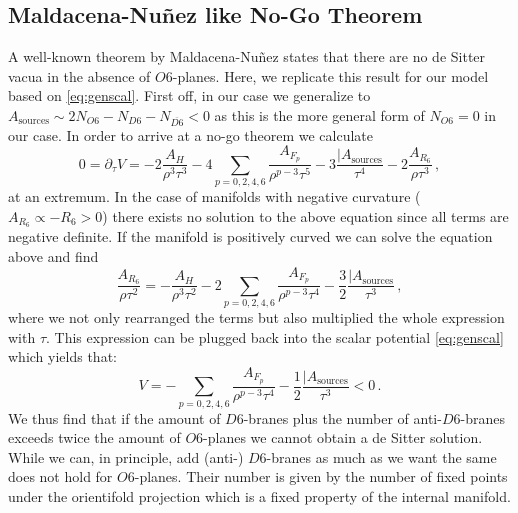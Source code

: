 \documentclass[12pt]{report}
\newcommand{\be}{\begin{equation}}
\newcommand{\ee}{\end{equation}}
\begin{document}
\subsection{Maldacena-Nu\~nez like No-Go Theorem}
A well-known theorem by Maldacena-Nu\~nez \cite{Maldacena:2000mw} states that there are no de Sitter vacua in the absence of $O6$-planes. Here, we replicate this result for our model based on \eqref{eq:genscal}. First off, in our case we generalize to $A_{\text{sources}} \sim 2 N_{O6} - N_{D6} - N_{\overline{D6}} < 0$ as this is the more general form of $N_{O6}=0$ in our case. In order to arrive at a no-go theorem we calculate
\be 
0= \partial_\tau V = -2 \frac{A_H}{\rho^ 3 \tau^3} - 4 \sum_{p=0,2,4,6} \frac{A_{F_p}}{\rho^ {p-3}\tau^ 5} - 3 \frac{|A_{\text{sources}}}{\tau^ 4} - 2 \frac{A_{R_6}}{\rho \tau^3}\,,
\ee
at an extremum. In the case of manifolds with negative curvature ($A_{R_6} \propto -R_6 >0$) there exists no solution to the above equation since all terms are negative definite. If the manifold is positively curved we can solve the equation above and find 
\be 
\frac{A_{R_6}}{\rho \tau^ 2} = - \frac{A_H}{\rho^ 3 \tau^2} - 2 \sum_{p=0,2,4,6} \frac{A_{F_p}}{\rho^ {p-3}\tau^ 4} - \frac{3}{2} \frac{|A_{\text{sources}}}{\tau^ 3}\,,
\ee
where we not only rearranged the terms but also multiplied the whole expression with $\tau$. This expression can be plugged back into the scalar potential \eqref{eq:genscal} which yields that:
\be 
V = -\sum_{p=0,2,4,6} \frac{A_{F_p}}{\rho^ {p-3}\tau^ 4} - \frac{1}{2} \frac{|A_{\text{sources}}}{\tau^ 3} < 0\,.
\ee
We thus find that if the amount of $D6$-branes plus the number of anti-$D6$-branes exceeds twice the amount of $O6$-planes we cannot obtain a de Sitter solution. While we can, in principle, add (anti-) $D6$-branes as much as we want the same does not hold for $O6$-planes. Their number is given by the number of fixed points under the orientifold projection which is a fixed property of the internal manifold.
\end{document}
